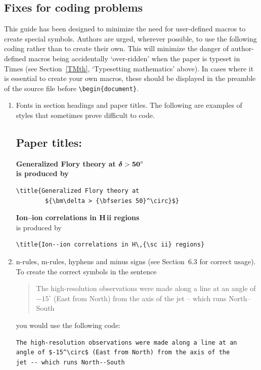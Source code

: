 \documentclass[]{tGIS2e}
\begin{document}
\subsection{Fixes for coding problems}

This guide has been designed to minimize the need for user-defined macros to  create special symbols. Authors
are urged, wherever possible, to use the following coding rather than to create their own. This will minimize
the danger of author-defined macros being accidentally  `over-ridden' when the paper is typeset in Times (see
Section~\ref{TMth}, `Typesetting mathematics' above). In cases where it is essential to create your own macros,
these should be displayed in the preamble of the source file before \verb"\begin{document}".

%
\begin{enumerate}
\item[(i)] Fonts in section headings and paper titles. The following are  examples
of styles that sometimes prove difficult to code.


\subsection*{P\lowercase{aper titles:}}

\bf{\noindent Generalized Flory theory at ${\bm\delta >
{\bf
   50}^\circ}$}\\

    \noindent\normalfont is produced by
\begin{verbatim}
\title{Generalized Flory theory at
        ${\bm\delta > {\bfseries 50}^\circ}$}
\end{verbatim}
\bigskip

{\bf{\noindent Ion--ion correlations in H\,{\sc ii} regions}}\\

\noindent\normalfont is produced by
%
\begin{verbatim}
\title{Ion--ion correlations in H\,{\sc ii} regions}
\end{verbatim}



\item[(ii)] n-rules, m-rules, hyphens and minus signs (see Section~6.3 for
correct usage). To create the correct symbols in the sentence
%
\begin{quote}
The high-resolution observations were made along a line at an
angle of $-15^\circ$ (East from North) from the axis of the
jet -- which runs North--South
\end{quote}
you would use the following code:
%
\begin{verbatim}
The high-resolution observations were made along a line at an
angle of $-15^\circ$ (East from North) from the axis of the
jet -- which runs North--South
\end{verbatim}


\end{enumerate}
\end{document}
